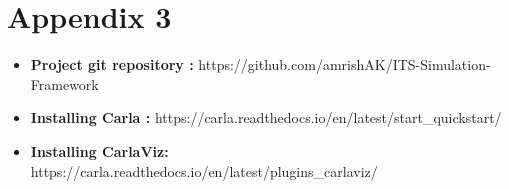 \chapter*{Appendix 3}
\begin{itemize}
    \item \textbf{Project git repository :} https://github.com/amrishAK/ITS-Simulation-Framework
    \item \textbf{Installing Carla :} https://carla.readthedocs.io/en/latest/start\_quickstart/
    \item \textbf{Installing CarlaViz:} https://carla.readthedocs.io/en/latest/plugins\_carlaviz/
\end{itemize}